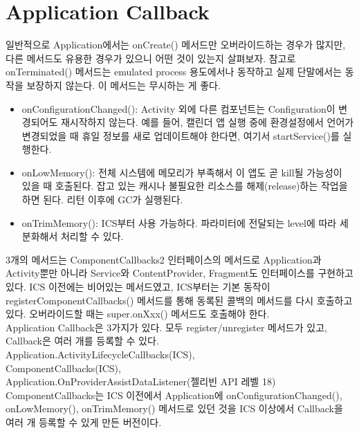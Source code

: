 \section{Application Callback}
일반적으로 Application에서는 onCreate() 메서드만 오버라이드하는 경우가 많지만,  
다른 메서드도 유용한 경우가 있으니 어떤 것이 있는지 살펴보자. 
참고로 onTerminated() 메서드는 emulated process 용도에서나 동작하고 실제 단말에서는 동작을 보장하지 않는다. 이 메서드는 무시하는 게 좋다.
\begin{itemize}
\item onConfigurationChanged(): Activity 외에 다른 컴포넌트는 Configuration이 변경되어도 재시작하지 않는다. 
예를 들어, 캘린더 앱 실행 중에 환경설정에서 언어가 변경되었을 때 휴일 정보를 새로 업데이트해야 한다면, 여기서 startService()를 실행한다.
\item onLowMemory(): 전체 시스템에 메모리가 부족해서 이 앱도 곧 kill될 가능성이 있을 때 호출된다. 잡고 있는 캐시나 불필요한 리소스를 해제(release)하는 작업을 하면 된다. 리턴 이후에 GC가 실행된다.
\item onTrimMemory(): ICS부터 사용 가능하다. 파라미터에 전달되는 level에 따라 세분화해서 처리할 수 있다.
\end{itemize}
3개의 메서드는 ComponentCallbacks2 인터페이스의 메서드로 Application과 Activity뿐만 아니라 Service와 ContentProvider, Fragment도 인터페이스를 구현하고 있다. ICS 이전에는 비어있는 메서드였고, ICS부터는 기본 동작이 registerComponentCallbacks() 메서드를 통해 동록된 콜백의 메서드를 다시 호출하고 있다. 오버라이드할 때는 super.onXxx() 메서드도 호출해야 한다.\\

Application Callback은 3가지가 있다. 모두 register/unregister 메서드가 있고, Callback은 여러 개를 등록할 수 있다.\\

Application.ActivityLifecycleCallbacks(ICS), \\
ComponentCallbacks(ICS), \\
Application.OnProviderAssistDataListener(젤리빈 API 레벨 18)\\

ComponentCallbacks는 ICS 이전에서 Application에 onConfigurationChanged(), onLowMemory(), onTrimMemory() 메서드로 있던 것을 ICS 이상에서 Callback을 여러 개 등록할 수 있게 만든 버전이다.\\

